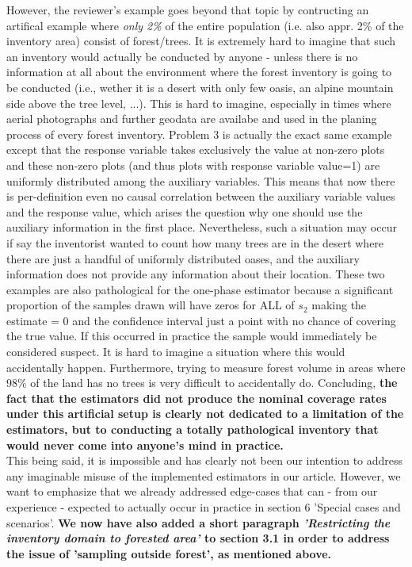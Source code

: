 \documentclass{article}
\begin{document}
However, the reviewer's example goes beyond that topic by contructing an artifical example where \textit{only 2\%} of the entire population (i.e. also appr. 2\% of the inventory area) consist of forest/trees. It is extremely hard to imagine that such an inventory would actually be conducted by anyone - unless there is no information at all about the environment where the forest inventory is going to be conducted (i.e., wether it is a desert with only few oasis, an alpine mountain side above the tree level, ...). This is hard to imagine, especially in times where aerial photographs and further geodata are availabe and used in the planing process of every forest inventory. Problem 3 is actually the exact same example except that the response variable takes exclusively the value  at non-zero plots and these non-zero plots (and thus plots with response variable value=1) are uniformly distributed among the auxiliary variables. This means that now there is per-definition even no causal correlation between the auxiliary variable values and the response value, which arises the question why one should use the auxiliary information in the first place. Nevertheless, such a situation may occur if say the inventorist wanted to count how many trees are in the desert where there are just a handful of uniformly distributed oases, and the auxiliary information does not provide any information about their location. These two examples are also pathological for the one-phase estimator because a significant proportion of the samples drawn will have zeros for ALL of $s_2$ making the estimate = 0 and the confidence interval just a point with no chance of covering the true value. If this occurred in practice the sample would immediately be considered suspect. It is hard to imagine a situation where this would accidentally happen. Furthermore, trying to measure forest volume in areas where 98\% of the land has no trees is very difficult to accidentally do. Concluding, \textbf{the fact that the estimators did not produce the nominal coverage rates under this artificial setup is clearly not dedicated to a limitation of the estimators, but to conducting a totally pathological inventory that would never come into anyone's mind in practice.}\\

This being said, it is impossible and has clearly not been our intention to address any imaginable misuse of the implemented estimators in our article. However, we want to emphasize that we already addressed edge-cases that can - from our experience -  expected to actually occur in practice in section 6 'Special cases and scenarios'. \textbf{We now have also added a short paragraph \textit{'Restricting the inventory domain to forested area'} to section 3.1 in order to address the issue of 'sampling outside forest', as mentioned above.}
\end{document}
